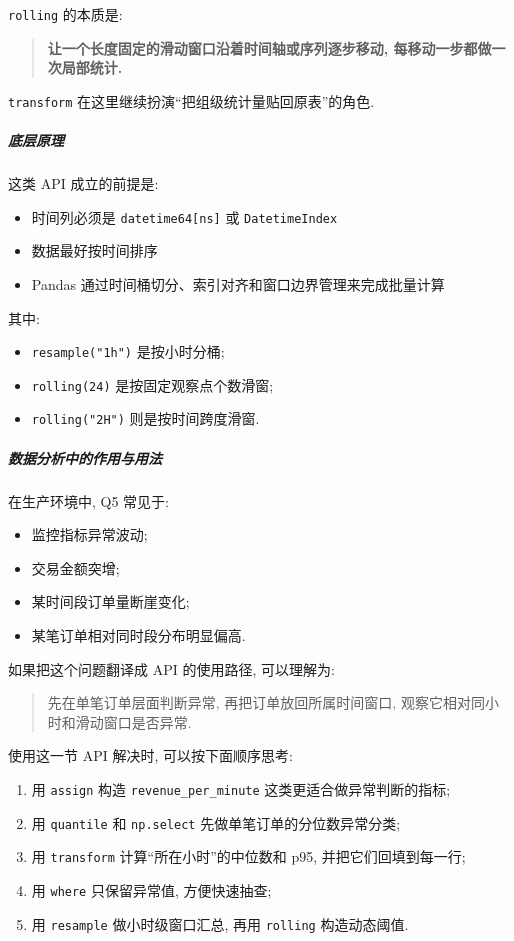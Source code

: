 \documentclass[11pt]{article}
\providecommand{\tightlist}{%
      \setlength{\itemsep}{0pt}\setlength{\parskip}{0pt}}
\begin{document}
\texttt{rolling} 的本质是:

\begin{quote}
\textbf{让一个长度固定的滑动窗口沿着时间轴或序列逐步移动,
每移动一步都做一次局部统计.}
\end{quote}

\texttt{transform} 在这里继续扮演``把组级统计量贴回原表''的角色.

    \subparagraph{底层原理}\label{ux5e95ux5c42ux539fux7406}

    这类 API 成立的前提是:

\begin{itemize}
\tightlist
\item
  时间列必须是 \texttt{datetime64{[}ns{]}} 或 \texttt{DatetimeIndex}
\item
  数据最好按时间排序
\item
  Pandas 通过时间桶切分、索引对齐和窗口边界管理来完成批量计算
\end{itemize}

其中:

\begin{itemize}
\tightlist
\item
  \texttt{resample("1h")} 是按小时分桶;
\item
  \texttt{rolling(24)} 是按固定观察点个数滑窗;
\item
  \texttt{rolling("2H")} 则是按时间跨度滑窗.
\end{itemize}

    \subparagraph{数据分析中的作用与用法}\label{ux6570ux636eux5206ux6790ux4e2dux7684ux4f5cux7528ux4e0eux7528ux6cd5}

    在生产环境中, Q5 常见于:

\begin{itemize}
\tightlist
\item
  监控指标异常波动;
\item
  交易金额突增;
\item
  某时间段订单量断崖变化;
\item
  某笔订单相对同时段分布明显偏高.
\end{itemize}

如果把这个问题翻译成 API 的使用路径, 可以理解为:

\begin{quote}
先在单笔订单层面判断异常, 再把订单放回所属时间窗口,
观察它相对同小时和滑动窗口是否异常.
\end{quote}

使用这一节 API 解决时, 可以按下面顺序思考:

\begin{enumerate}
\def\labelenumi{\arabic{enumi}.}
\tightlist
\item
  用 \texttt{assign} 构造 \texttt{revenue\_per\_minute}
  这类更适合做异常判断的指标;
\item
  用 \texttt{quantile} 和 \texttt{np.select}
  先做单笔订单的分位数异常分类;
\item
  用 \texttt{transform} 计算``所在小时''的中位数和 p95,
  并把它们回填到每一行;
\item
  用 \texttt{where} 只保留异常值, 方便快速抽查;
\item
  用 \texttt{resample} 做小时级窗口汇总, 再用 \texttt{rolling}
  构造动态阈值.
\end{enumerate}
\end{document}
